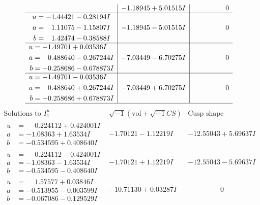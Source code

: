 \documentclass[1p]{elsarticle_modified}
\theoremstyle{definition}
\newcommand{\I}{\sqrt{-1}}
\begin{document}
$$\begin{array}{c|c|c}
 & -1.18945 + 5.01515 I & \phantom{-0.000000 } 0 \\ \hline\begin{aligned}
u &= -1.44421 - 0.28194 I \\
a &= \phantom{-}1.11075 - 1.15807 I \\
b &= \phantom{-}1.42474 - 0.38588 I\end{aligned}
 & -1.18945 - 5.01515 I & \phantom{-0.000000 } 0 \\ \hline\begin{aligned}
u &= -1.49701 + 0.03536 I \\
a &= \phantom{-}0.488640 - 0.267244 I \\
b &= -0.258686 - 0.678873 I\end{aligned}
 & -7.03449 - 6.70275 I & \phantom{-0.000000 } 0 \\ \hline\begin{aligned}
u &= -1.49701 - 0.03536 I \\
a &= \phantom{-}0.488640 + 0.267244 I \\
b &= -0.258686 + 0.678873 I\end{aligned}
 & -7.03449 + 6.70275 I & \phantom{-0.000000 } 0\\
 \hline 
 \end{array}$$\newpage$$\begin{array}{c|c|c}  
\text{Solutions to }I^u_{1}& \I (\text{vol} + \sqrt{-1}CS) & \text{Cusp shape}\\
 \hline 
\begin{aligned}
u &= \phantom{-}0.224112 + 0.424001 I \\
a &= -1.08363 + 1.63534 I \\
b &= -0.534595 + 0.408640 I\end{aligned}
 & -1.70121 - 1.12219 I & -12.55043 + 5.69637 I \\ \hline\begin{aligned}
u &= \phantom{-}0.224112 - 0.424001 I \\
a &= -1.08363 - 1.63534 I \\
b &= -0.534595 - 0.408640 I\end{aligned}
 & -1.70121 + 1.12219 I & -12.55043 - 5.69637 I \\ \hline\begin{aligned}
u &= \phantom{-}1.57577 + 0.03846 I \\
a &= -0.513955 - 0.003599 I \\
b &= -0.067086 - 0.129529 I\end{aligned}
 & -10.71130 + 0.03287 I & \phantom{-0.000000 } 0 \\ \hline\begin{aligned}

\end{aligned}
\end{array}$$
\end{document}

